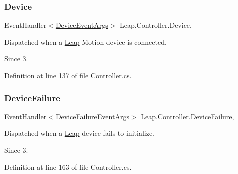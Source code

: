 \mbox{\label{class_leap_1_1_controller_ac9a2f80c418e12b42b8331c0d5b116b1}} 
\subsubsection{\texorpdfstring{Device}{Device}}
{\footnotesize\ttfamily Event\+Handler$<$\mbox{\hyperlink{class_leap_1_1_device_event_args}{Device\+Event\+Args}}$>$ Leap.\+Controller.\+Device\hspace{0.3cm}{\ttfamily [add]}, {\ttfamily [remove]}}



Dispatched when a \mbox{\hyperlink{namespace_leap}{Leap}} Motion device is connected. 

\begin{DoxySince}{Since}
3. 
\end{DoxySince}


Definition at line 137 of file Controller.\+cs.

\mbox{\label{class_leap_1_1_controller_aebe559b634e766a31c1f2041714313ca}} 
\subsubsection{\texorpdfstring{DeviceFailure}{DeviceFailure}}
{\footnotesize\ttfamily Event\+Handler$<$\mbox{\hyperlink{class_leap_1_1_device_failure_event_args}{Device\+Failure\+Event\+Args}}$>$ Leap.\+Controller.\+Device\+Failure\hspace{0.3cm}{\ttfamily [add]}, {\ttfamily [remove]}}



Dispatched when a \mbox{\hyperlink{namespace_leap}{Leap}} device fails to initialize. 

\begin{DoxySince}{Since}
3. 
\end{DoxySince}


Definition at line 163 of file Controller.\+cs.

\mbox{\label{class_leap_1_1_controller_a1f624439c16ddaf866ac657aa811a622}} 
